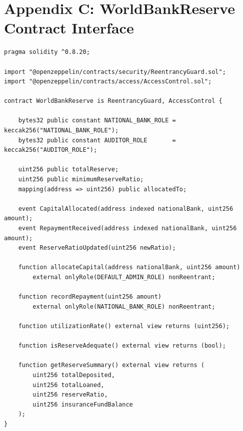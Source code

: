 \documentclass[12pt,a4paper]{report}
\begin{document}
\chapter*{Appendix C: WorldBankReserve Contract Interface}
{}


\begin{lstlisting}[language=Solidity,basicstyle=\ttfamily\scriptsize,breaklines=true,
    commentstyle=\color{GrayText},keywordstyle=\color{PrimaryBlue}\bfseries,
    frame=single,rulecolor=\color{AccentBlue!40},captionpos=b,
    caption={WorldBankReserve.sol -- Tier 1 public interface. Full implementation in project repository.}]
pragma solidity ^0.8.20;

import "@openzeppelin/contracts/security/ReentrancyGuard.sol";
import "@openzeppelin/contracts/access/AccessControl.sol";

contract WorldBankReserve is ReentrancyGuard, AccessControl {

    bytes32 public constant NATIONAL_BANK_ROLE = keccak256("NATIONAL_BANK_ROLE");
    bytes32 public constant AUDITOR_ROLE       = keccak256("AUDITOR_ROLE");

    uint256 public totalReserve;
    uint256 public minimumReserveRatio;
    mapping(address => uint256) public allocatedTo;

    event CapitalAllocated(address indexed nationalBank, uint256 amount);
    event RepaymentReceived(address indexed nationalBank, uint256 amount);
    event ReserveRatioUpdated(uint256 newRatio);

    function allocateCapital(address nationalBank, uint256 amount)
        external onlyRole(DEFAULT_ADMIN_ROLE) nonReentrant;

    function recordRepayment(uint256 amount)
        external onlyRole(NATIONAL_BANK_ROLE) nonReentrant;

    function utilizationRate() external view returns (uint256);

    function isReserveAdequate() external view returns (bool);

    function getReserveSummary() external view returns (
        uint256 totalDeposited,
        uint256 totalLoaned,
        uint256 reserveRatio,
        uint256 insuranceFundBalance
    );
}
\end{lstlisting}
\end{document}
